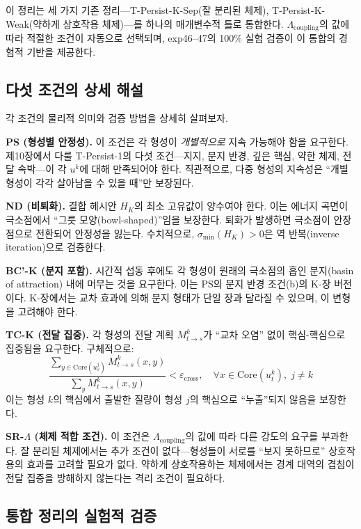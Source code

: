 이 정리는 세 가지 기존 정리---T-Persist-K-Sep(잘 분리된 체제), T-Persist-K-Weak(약하게 상호작용 체제)---를 하나의 매개변수적 틀로 통합한다. $\Lambda_{\mathrm{coupling}}$의 값에 따라 적절한 조건이 자동으로 선택되며, exp46--47의 100\% 실험 검증이 이 통합의 경험적 기반을 제공한다.

\subsection{다섯 조건의 상세 해설}

각 조건의 물리적 의미와 검증 방법을 상세히 살펴보자.

\textbf{PS (형성별 안정성).} 이 조건은 각 형성이 \emph{개별적으로} 지속 가능해야 함을 요구한다. 제10장에서 다룰 T-Persist-1의 다섯 조건---지지, 분지 반경, 깊은 핵심, 약한 체제, 전달 속박---이 각 $u^k$에 대해 만족되어야 한다. 직관적으로, 다중 형성의 지속성은 ``개별 형성이 각각 살아남을 수 있을 때''만 보장된다.

\textbf{ND (비퇴화).} 결합 헤시안 $H_K$의 최소 고유값이 양수여야 한다. 이는 에너지 곡면이 극소점에서 ``그릇 모양(bowl-shaped)''임을 보장한다. 퇴화가 발생하면 극소점이 안장점으로 전환되어 안정성을 잃는다. 수치적으로, $\sigma_{\min}(H_K) > 0$은 역 반복(inverse iteration)으로 검증한다.

\textbf{BC'-K (분지 포함).} 시간적 섭동 후에도 각 형성이 원래의 극소점의 흡인 분지(basin of attraction) 내에 머무는 것을 요구한다. 이는 PS의 분지 반경 조건(b)의 K-장 버전이다. K-장에서는 교차 효과에 의해 분지 형태가 단일 장과 달라질 수 있으며, 이 변형을 고려해야 한다.

\textbf{TC-K (전달 집중).} 각 형성의 전달 계획 $M^k_{t \to s}$가 ``교차 오염'' 없이 핵심-핵심으로 집중됨을 요구한다. 구체적으로:
\begin{equation}
    \frac{\sum_{y \in \mathrm{Core}(u^j_s)} M^k_{t \to s}(x, y)}{\sum_y M^k_{t \to s}(x, y)} < \varepsilon_{\mathrm{cross}}, \quad \forall x \in \mathrm{Core}(u^k_t),\; j \neq k
    \label{eq:cross-contamination}
\end{equation}
이는 형성 $k$의 핵심에서 출발한 질량이 형성 $j$의 핵심으로 ``누출''되지 않음을 보장한다.

\textbf{SR-$\Lambda$ (체제 적합 조건).} 이 조건은 $\Lambda_{\mathrm{coupling}}$의 값에 따라 다른 강도의 요구를 부과한다. 잘 분리된 체제에서는 추가 조건이 없다---형성들이 서로를 ``보지 못하므로'' 상호작용의 효과를 고려할 필요가 없다. 약하게 상호작용하는 체제에서는 경계 대역의 겹침이 전달 집중을 방해하지 않는다는 격리 조건이 필요하다.

\subsection{통합 정리의 실험적 검증}

